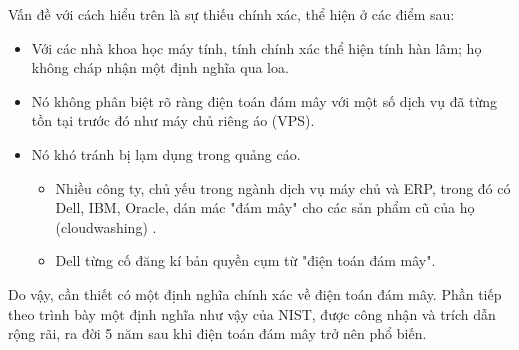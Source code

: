 \documentclass{article}
\begin{document}
Vấn đề với cách hiểu trên là sự thiếu chính xác, thể hiện ở các điểm sau:

\begin{itemize}
    \item Với các nhà khoa học máy tính, tính chính xác thể hiện tính hàn lâm;
    họ không cháp nhận một định nghĩa qua loa.
    \item Nó không phân biệt rõ ràng điện toán đám mây với một số dịch vụ đã
    từng tồn tại trước đó như máy chủ riêng áo (VPS).
    \item Nó khó tránh bị lạm dụng trong quảng cáo.
    \begin{itemize}
        \item Nhiều công ty, chủ yếu trong ngành dịch vụ máy chủ và ERP, trong
        đó có Dell, IBM, Oracle, dán mác "đám mây" cho các sản phẩm cũ của họ
        (cloudwashing) \cite{MITTR2011}.
        \item  Dell từng cố đăng kí bản quyền cụm từ "điện toán đám
        mây".
    \end{itemize}
\end{itemize}

Do vậy, cần thiết có một định nghĩa chính xác về điện toán đám mây. Phần tiếp
theo trình bày một định nghĩa như vậy của NIST, được công nhận và trích dẫn rộng
rãi, ra đời 5 năm sau khi điện toán đám mây trở nên phổ biến.

\printbibliography
\end{document}
